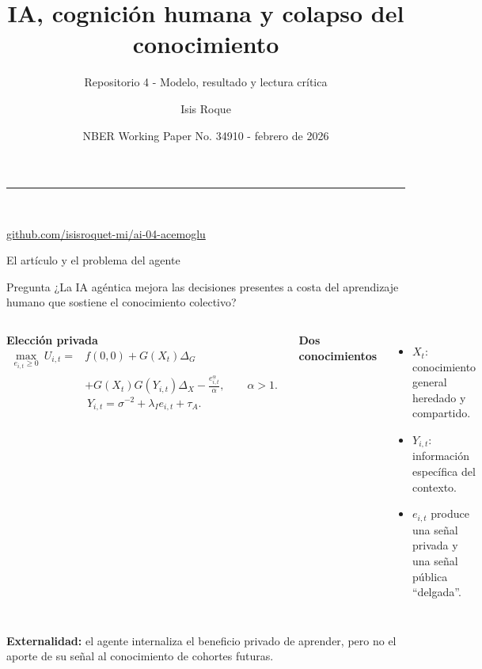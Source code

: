 \documentclass[aspectratio=169,11pt]{beamer}
\title{IA, cognición humana y colapso del conocimiento}
\subtitle{Repositorio 4 - Modelo, resultado y lectura crítica}
\author{Isis Roque}
\date{NBER Working Paper No. 34910 - febrero de 2026}
\newcommand{\azul}[1]{\textcolor{AzulMedio}{\textbf{#1}}}
\newcommand{\repo}{\href{https://github.com/isisroquet-mi/ai-04-acemoglu}{github.com/isisroquet-mi/ai-04-acemoglu}}
\begin{document}
\begingroup
{}
\begin{frame}[plain]
  \vfill
  \hspace{0.65cm}\begin{minipage}{0.84\paperwidth}
    {\color{AzulClaro}\rule{1.6cm}{2pt}}\\[0.45cm]
    {\color{white}\inserttitle\par}
    \vspace{0.34cm}
    {\large\color{AzulHielo}\insertsubtitle\par}
    \vspace{0.85cm}
    {\normalsize\color{white}\insertauthor\par}
    {\small\color{AzulHielo}\insertdate\par}
    \vspace{0.45cm}
    {\small\color{AzulClaro}\repo}
  \end{minipage}
  \vfill
\end{frame}
\endgroup

\begin{frame}{El artículo y el problema del agente}
\begin{block}{Pregunta}
¿La IA agéntica mejora las decisiones presentes a costa del aprendizaje humano que sostiene el conocimiento colectivo?
\end{block}

\begin{columns}[T,onlytextwidth]
\azul{Elección privada}
{\small
\[
\begin{aligned}
\max_{e_{i,t}\ge 0}\ U_{i,t}
={}&f(0,0)+G(X_t)\Delta_G\\
&+G(X_t)G(Y_{i,t})\Delta_X-\frac{e_{i,t}^{\alpha}}{\alpha},
\qquad \alpha>1.
\end{aligned}
\]}
\[
Y_{i,t}=\sigma^{-2}+\lambda_I e_{i,t}+\tau_A.
\]

\azul{Dos conocimientos}
\begin{itemize}\small
  \item $X_t$: conocimiento general heredado y compartido.
  \item $Y_{i,t}$: información específica del contexto.
  \item $e_{i,t}$ produce una señal privada y una señal pública ``delgada''.
\end{itemize}
\end{columns}

\vspace{0.05cm}
{\small\color{Gris}\textbf{Externalidad:} el agente internaliza el beneficio privado de aprender, pero no el aporte de su señal al conocimiento de cohortes futuras.}
\end{frame}
\end{document}

